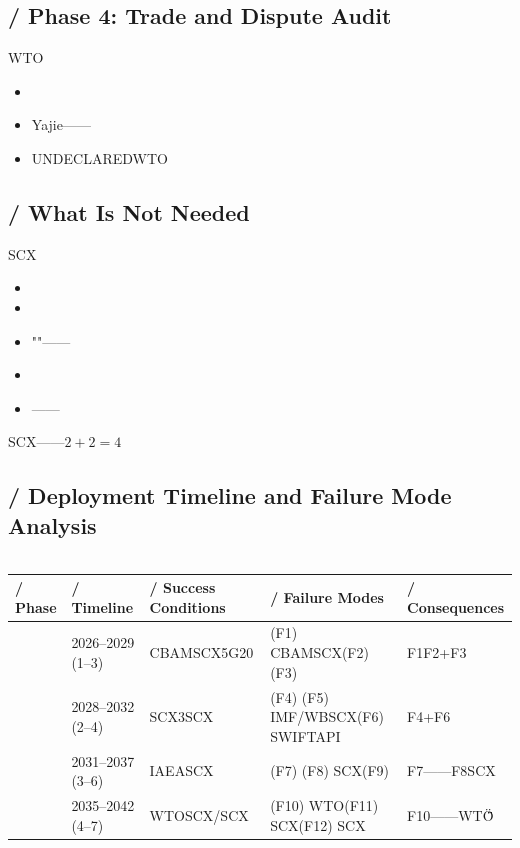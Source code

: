 \documentclass[12pt,a4paper]{article}
\theoremstyle{remark}
\begin{document}
\subsection{ / Phase 4: Trade and Dispute Audit}

WTO

\begin{itemize}[nosep]
    \item 
    \item Yajie——\textbf{}
    \item UNDECLAREDWTO
\end{itemize}

\subsection{ / What Is Not Needed}

SCX\textbf{}

\begin{itemize}[nosep]
    \item 
    \item 
    \item ""——
    \item 
    \item ——
\end{itemize}

SCX\textbf{}——$2+2=4$

\subsection{ / Deployment Timeline and Failure Mode Analysis}

\subsubsection{}



\begin{table}[H]
\centering
\begin{tabular}{p{2cm} p{2cm} p{3.5cm} p{3.5cm} p{2.5cm}}
    \toprule
    \textbf{ / Phase} & \textbf{ / Timeline} & \textbf{ / Success Conditions} & \textbf{ / Failure Modes} & \textbf{ / Consequences} \\
    \midrule
     & 2026--2029 (1--3) & CBAMSCX5G20 & (F1) CBAMSCX(F2) (F3)  & F1F2+F3 \\
    \midrule
     & 2028--2032 (2--4) & SCX3SCX & (F4) (F5) IMF/WBSCX(F6) SWIFTAPI & F4+F6 \\
    \midrule
     & 2031--2037 (3--6) & IAEASCX & (F7) (F8) SCX(F9)  & F7——F8SCX \\
    \midrule
     & 2035--2042 (4--7) & WTOSCX/SCX & (F10) WTO(F11) SCX(F12) SCX & F10——WTO\"\"\"\" \\
    \bottomrule
\end{tabular}
\caption{}
\end{table}
\end{document}
